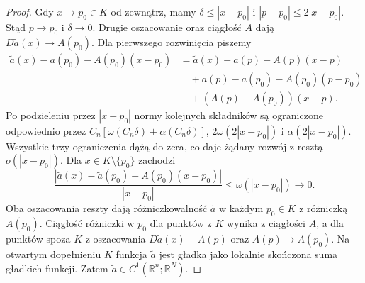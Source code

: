 \begin{proof}
Gdy $x\to p_0\in K$ od zewnątrz, mamy
$\delta\le|x-p_0|$ i $|p-p_0|\le2|x-p_0|$.
Stąd $p\to p_0$ i $\delta\to0$. Drugie oszacowanie
oraz ciągłość $A$ dają $D\widetilde a(x)\to A(p_0)$.
Dla pierwszego rozwinięcia piszemy
\begin{align*}
 \widetilde a(x)-a(p_0)-A(p_0)(x-p_0)
 &=\widetilde a(x)-a(p)-A(p)(x-p)\\
 &\quad+a(p)-a(p_0)-A(p_0)(p-p_0)\\
 &\quad+(A(p)-A(p_0))(x-p).
\end{align*}
Po podzieleniu przez $|x-p_0|$ normy kolejnych
składników są ograniczone odpowiednio przez
$C_n[\omega(C_n\delta)+\alpha(C_n\delta)]$,
$2\omega(2|x-p_0|)$ i $\alpha(2|x-p_0|)$.
Wszystkie trzy ograniczenia dążą do zera,
co daje żądany rozwój z resztą $o(|x-p_0|)$.
Dla $x\in K\setminus\{p_0\}$ zachodzi
\[
 \frac{|\widetilde a(x)-\widetilde a(p_0)-A(p_0)(x-p_0)|}
 {|x-p_0|}\le\omega(|x-p_0|)\longrightarrow0.
\]
Oba oszacowania reszty dają różniczkowalność
$\widetilde a$ w każdym $p_0\in K$ z różniczką $A(p_0)$.
Ciągłość różniczki w $p_0$ dla punktów z $K$
wynika z ciągłości $A$, a dla punktów spoza $K$
z oszacowania $D\widetilde a(x)-A(p)$ oraz
$A(p)\to A(p_0)$. Na otwartym dopełnieniu $K$
funkcja $\widetilde a$ jest gładka jako lokalnie
skończona suma gładkich funkcji. Zatem
$\widetilde a\in C^1(\mathbb R^n;\mathbb R^N)$.
\end{proof}

